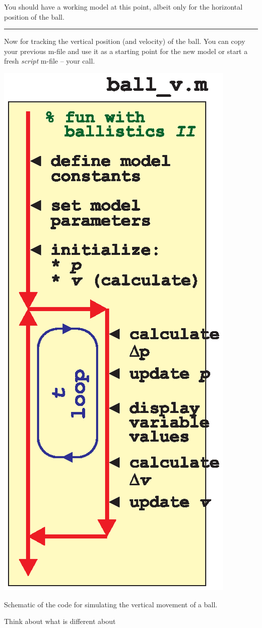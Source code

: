 \documentclass{tufte-book} %
\begin{document}
You should have a working model at this point, albeit only for the horizontal position of the ball.

\vspace{1mm}
\noindent\rule{4cm}{0.5pt}
\vspace{-2mm}

 Now for tracking the vertical position (and velocity) of the ball. You can copy your previous \textsf{m-file} and use it as a starting point for the new model or start a fresh \textit{script} m-file -- your call.

\begin{marginfigure}[-0.0in]
\includegraphics[width=\linewidth]{ch9-schematic-ball_v.eps}
\caption{Schematic of the code for simulating the vertical movement of a ball.}
\label{fig:ch9-schematic-ball_v}
\end{marginfigure}

Think about what is different about
\end{document}
